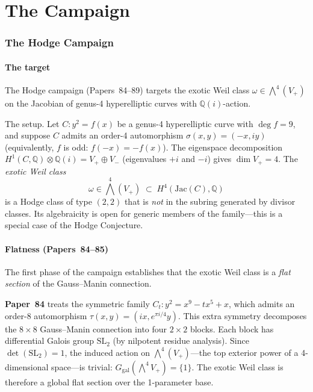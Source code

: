 \documentclass[11pt]{article}
\theoremstyle{plain}
\theoremstyle{definition}
\theoremstyle{remark}
\newcommand{\QQ}{\mathbb{Q}}
\newcommand{\SL}{\mathrm{SL}}
\newcommand{\Jac}{\mathrm{Jac}}
\begin{document}
\part{The Campaign}\label{part:campaign}

\section{The Hodge Campaign}\label{sec:hodge-campaign}

\subsection{The target}

The Hodge campaign (Papers~84--89) targets the exotic Weil class
$\omega \in \bigwedge^4(V_+)$ on the Jacobian of genus-4
hyperelliptic curves with $\QQ(i)$-action.

The setup.  Let $C: y^2 = f(x)$ be a genus-4 hyperelliptic curve
with $\deg f = 9$, and suppose $C$ admits an order-4 automorphism
$\sigma(x,y) = (-x, iy)$ (equivalently, $f$ is odd: $f(-x) = -f(x)$).
The eigenspace decomposition
$H^1(C, \QQ) \otimes \QQ(i) = V_+ \oplus V_-$
(eigenvalues $+i$ and $-i$) gives $\dim V_+ = 4$.  The
\emph{exotic Weil class}
\[
  \omega \in \bigwedge^4(V_+) \;\subset\; H^4(\Jac(C), \QQ)
\]
is a Hodge class of type $(2,2)$ that is \emph{not} in the subring
generated by divisor classes.  Its algebraicity is open for generic
members of the family---this is a special case of the Hodge
Conjecture.


\subsection{Flatness (Papers~84--85)}

The first phase of the campaign establishes that the exotic Weil
class is a \emph{flat section} of the Gauss--Manin connection.

\medskip
\noindent\textbf{Paper~84} \cite{p84} treats the symmetric family
$C_t: y^2 = x^9 - tx^5 + x$, which admits an order-8 automorphism
$\tau(x,y) = (ix, e^{\pi i/4} y)$.  This extra symmetry decomposes
the $8 \times 8$ Gauss--Manin connection into four $2 \times 2$
blocks.  Each block has differential Galois group $\SL_2$ (by
nilpotent residue analysis).  Since $\det(\SL_2) = 1$, the induced
action on $\bigwedge^4(V_+)$---the top exterior power of a
4-dimensional space---is trivial:
$G_{\mathrm{gal}}(\bigwedge^4 V_+) = \{1\}$.  The exotic Weil
class is therefore a global flat section over the 1-parameter base.
\end{document}
